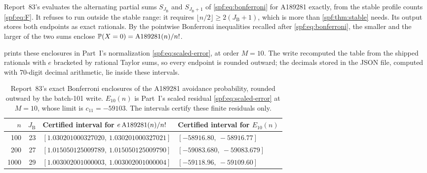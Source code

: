 \documentclass[11pt]{article}
\numberwithin{equation}{section}
\theoremstyle{definition}
\theoremstyle{remark}
\theoremstyle{definition}
\newcommand{\Pp}{\mathbb P}
\newcommand{\Aone}{\textnormal{A189281}}
\begin{document}
Report~83's  evaluates the
alternating partial sums $S_{J_{\mathrm B}}$ and $S_{J_{\mathrm B}+1}$ of
\eqref{spf:eq:bonferroni} for A189281 exactly, from the stable profile
counts \eqref{spf:eq:F}. It refuses to run outside the stable range: it
requires $\lfloor n/2\rfloor\ge2(J_{\mathrm B}+1)$, which is more than
\cref{spf:thm:stable} needs. Its output
 stores both endpoints as
exact rationals. By the pointwise Bonferroni inequalities recalled after
\eqref{spf:eq:bonferroni}, the smaller and the larger of the two sums
enclose $\Pp(X=0)=\Aone(n)/n!$.

 prints these enclosures in Part~I's
normalization \eqref{spf:eq:scaled-error}, at order $M=10$. The write
recomputed the table from the shipped rationals with $e$ bracketed by
rational Taylor sums, so every endpoint is rounded outward; the decimals
stored in the JSON file, computed with 70-digit decimal arithmetic, lie
inside these intervals.

\begin{table}[htbp]
\centering\small
\renewcommand{\arraystretch}{1.17}
\begin{tabular}{rrll}
\toprule
$n$ & $J_{\mathrm B}$ & Certified interval for $e\,\Aone(n)/n!$ & Certified interval for $E_{10}(n)$\\
\midrule
100  & 23 & $[1.030201000327020,\ 1.030201000327021]$ & $[-58916.80,\ -58916.77]$\\
200  & 27 & $[1.015050125009789,\ 1.015050125009790]$ & $[-59083.680,\ -59083.679]$\\
1000 & 29 & $[1.003002001000003,\ 1.003002001000004]$ & $[-59118.96,\ -59109.60]$\\
\bottomrule
\end{tabular}
\caption{Report~83's exact Bonferroni enclosures of the A189281 avoidance
probability, rounded outward by the batch-101 write. $E_{10}(n)$ is
Part~I's scaled residual \eqref{spf:eq:scaled-error} at $M=10$, whose limit
is $c_{11}=-59103$. The intervals certify these finite residuals only.}
\label{spf:fd:tab:bonferroni}
\end{table}
\end{document}
